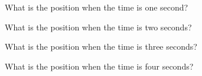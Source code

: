 \begin{problem}
\begin{subproblem}
    \item What is the position when the time is one second?
      \vspace{3em}

    \item What is the position when the time is two seconds?
      \vspace{3em}

    \item What is the position when the time is three seconds?
      \vspace{3em}

    \item What is the position when the time is four seconds?
      \vspace{3em}

  \end{subproblem}



\end{problem}


